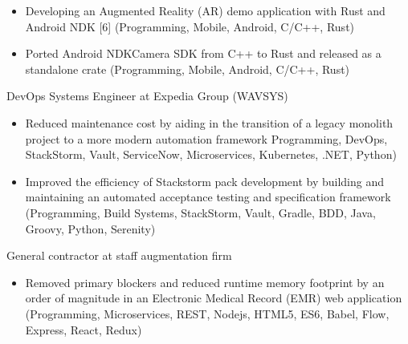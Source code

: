 \begin{itemize}
  \item Developing an Augmented Reality (AR) demo application with Rust and Android NDK [6] {\tiny (Programming, Mobile, Android, C/C++, Rust)}
  \item Ported Android NDKCamera SDK from C++ to Rust and released as a standalone crate {\tiny (Programming, Mobile, Android, C/C++, Rust)}
\end{itemize}

\divider




DevOps Systems Engineer at Expedia Group (WAVSYS)


\begin{itemize}
  \item Reduced maintenance cost by aiding in the transition of a legacy monolith project to a more modern automation framework {\tiny Programming, DevOps, StackStorm, Vault, ServiceNow, Microservices, Kubernetes, .NET, Python)}
  \item Improved the efficiency of Stackstorm pack development by building and maintaining an automated acceptance testing and specification framework {\tiny (Programming, Build Systems, StackStorm, Vault, Gradle, BDD, Java, Groovy, Python, Serenity)}
\end{itemize}

\divider




General contractor at staff augmentation firm

\begin{itemize}
  \item Removed primary blockers and reduced runtime memory footprint by an order of magnitude in an Electronic Medical Record (EMR) web application {\tiny (Programming, Microservices, REST, Nodejs, HTML5, ES6, Babel, Flow, Express, React, Redux)}
\end{itemize}

